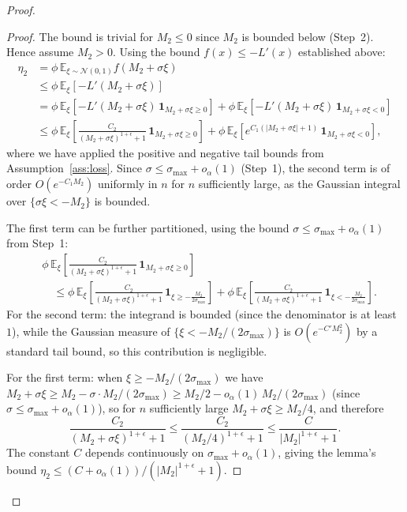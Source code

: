 \documentclass[11pt]{article}
\newcommand{\EE}{\mathbb{E}}
\newcommand{\NN}{\mathcal{N}}
\begin{document}
\begin{proof}
\begin{proof}
The bound is trivial for $M_2 \leq 0$ since $M_2$ is bounded below
(Step~2).
Hence assume $M_2 > 0$.
Using the bound $f(x) \leq -L'(x)$ established above:
\begin{align*}
\eta_2
&= \phi\,\EE_{\xi \sim \NN(0,1)} f(M_2 + \sigma \xi) \\
&\leq \phi\,\EE_{\xi}[-L'(M_2 + \sigma \xi)] \\
&= \phi\,\EE_{\xi}\!\left[
   -L'(M_2 + \sigma \xi)\,\mathbf{1}_{M_2 + \sigma\xi \geq 0}
\right]
 + \phi\,\EE_{\xi}\!\left[
   -L'(M_2 + \sigma \xi)\,\mathbf{1}_{M_2 + \sigma\xi < 0}
\right] \\
&\leq \phi\,\EE_{\xi}\!\left[
   \frac{C_2}{(M_2 + \sigma\xi)^{1+\epsilon}+1}\,
   \mathbf{1}_{M_2 + \sigma\xi \geq 0}
\right]
 + \phi\,\EE_{\xi}\!\left[
   e^{C_1(|M_2 + \sigma\xi|+1)}\,
   \mathbf{1}_{M_2 + \sigma\xi < 0}
\right],
\end{align*}
where we have applied the positive and negative tail bounds from
Assumption~\ref{ass:loss}.
Since $\sigma \leq \sigma_{\max} + o_\alpha(1)$ (Step~1), the second
term is of order $O(e^{-C_1 M_2})$ uniformly in $n$ for $n$
sufficiently large, as the Gaussian integral over
$\{\sigma\xi < -M_2\}$ is bounded.

The first term can be further partitioned, using the bound
$\sigma \leq \sigma_{\max} + o_\alpha(1)$ from Step~1:
\begin{align*}
&\phi\,\EE_{\xi}\!\left[
   \frac{C_2}{(M_2 + \sigma\xi)^{1+\epsilon}+1}\,
   \mathbf{1}_{M_2 + \sigma\xi \geq 0}
\right] \\
&\quad\leq
\phi\,\EE_{\xi}\!\left[
   \frac{C_2}{(M_2 + \sigma\xi)^{1+\epsilon}+1}\,
   \mathbf{1}_{\xi \geq -\frac{M_2}{2\sigma_{\max}}}
\right]
 + \phi\,\EE_{\xi}\!\left[
   \frac{C_2}{(M_2 + \sigma\xi)^{1+\epsilon}+1}\,
   \mathbf{1}_{\xi < -\frac{M_2}{2\sigma_{\max}}}
\right].
\end{align*}
For the second term: the integrand is bounded (since the denominator
is at least $1$), while the Gaussian measure of
$\{\xi < -M_2/(2\sigma_{\max})\}$ is $O(e^{-C'M_2^2})$ by a standard
tail bound, so this contribution is negligible.

For the first term: when $\xi \geq -M_2/(2\sigma_{\max})$ we have
$M_2 + \sigma\xi \geq M_2 - \sigma \cdot M_2/(2\sigma_{\max})
\geq M_2/2 - o_\alpha(1)\,M_2/(2\sigma_{\max})$
(since $\sigma \leq \sigma_{\max} + o_\alpha(1)$), so for $n$
sufficiently large $M_2 + \sigma\xi \geq M_2/4$, and therefore
\[
\frac{C_2}{(M_2 + \sigma\xi)^{1+\epsilon}+1}
\leq \frac{C_2}{(M_2/4)^{1+\epsilon}+1}
\leq \frac{C}{|M_2|^{1+\epsilon}+1}.
\]
The constant $C$ depends continuously on $\sigma_{\max}+o_\alpha(1)$,
giving the lemma's bound
$\eta_2 \leq (C+o_\alpha(1))/(|M_2|^{1+\epsilon}+1)$. 
\end{proof}


\end{proof}
\end{document}
